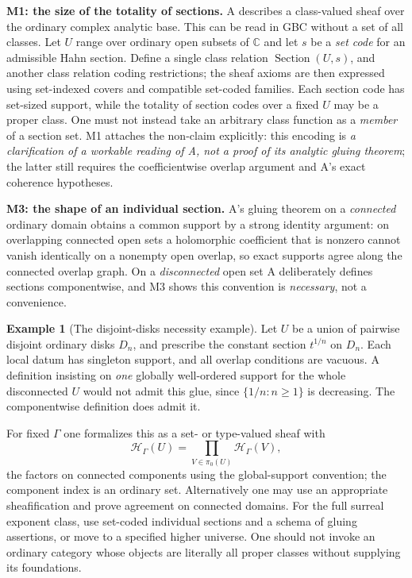 \documentclass[11pt,letterpaper]{article}
\numberwithin{equation}{section}
\theoremstyle{definition}
\newtheorem{example}[theorem]{Example}
\theoremstyle{remark}
\newcommand{\C}{\mathbb C}
\newcommand{\HH}{\mathcal H}
\begin{document}
\medskip\noindent
\textbf{M1: the size of the totality of sections.} A describes a class-valued
sheaf over the ordinary complex analytic base. This can be read in GBC without a
set of all classes. Let $U$ range over ordinary open subsets of $\C$ and let
$s$ be a \emph{set code} for an admissible Hahn section. Define a single class
relation $\operatorname{Section}(U,s)$, and another class relation coding
restrictions; the sheaf axioms are then expressed using set-indexed covers and
compatible set-coded families. Each section code has set-sized support, while
the totality of section codes over a fixed $U$ may be a proper class. One must
not instead take an arbitrary class function as a \emph{member} of a section
set. M1 attaches the non-claim explicitly: this encoding is \emph{a
clarification of a workable reading of A, not a proof of its analytic gluing
theorem}; the latter still requires the coefficientwise overlap argument and A's
exact coherence hypotheses.

\medskip\noindent
\textbf{M3: the shape of an individual section.} A's gluing theorem on a
\emph{connected} ordinary domain obtains a common support by a strong identity
argument: on overlapping connected open sets a holomorphic coefficient that is
nonzero cannot vanish identically on a nonempty open overlap, so exact supports
agree along the connected overlap graph. On a \emph{disconnected} open set A
deliberately defines sections componentwise, and M3 shows this convention is
\emph{necessary}, not a convenience.

\begin{example}[The disjoint-disks necessity example]\label{found:ex:disjointdisks}
Let $U$ be a union of pairwise disjoint ordinary disks $D_n$, and prescribe the
constant section $t^{1/n}$ on $D_n$. Each local datum has singleton support, and
all overlap conditions are vacuous. A definition insisting on \emph{one} globally
well-ordered support for the whole disconnected $U$ would not admit this glue,
since $\{1/n:n\ge1\}$ is decreasing. The componentwise definition does admit it.
\end{example}

For fixed $\Gamma$ one formalizes this as a set- or type-valued sheaf with
\begin{equation}\label{found:eq:componentwise}
 \HH_\Gamma(U)=\prod_{V\in\pi_0(U)}\HH_\Gamma(V),
\end{equation}
the factors on connected components using the global-support convention; the
component index is an ordinary set. Alternatively one may use an appropriate
sheafification and prove agreement on connected domains. For the full surreal
exponent class, use set-coded individual sections and a schema of gluing
assertions, or move to a specified higher universe. One should not invoke an
ordinary category whose objects are literally all proper classes without
supplying its foundations.
\end{document}
